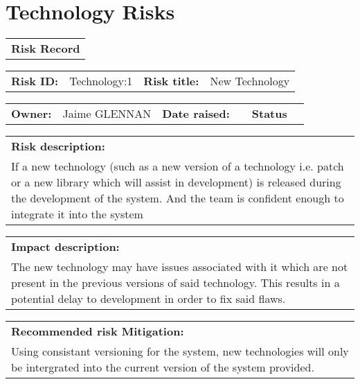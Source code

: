 \FloatBarrier

\section{Technology Risks}
\label{Technology_Risks}

\FloatBarrier

\begin{table}%
	\begin{tabularx}{\textwidth}{| X |}
		\hline
		\textbf{Risk Record} \\
	\end{tabularx}
	\begin{tabularx}{\textwidth}{| l | X | l | X |}
		\hline
		\textbf{Risk ID:} & Technology:1 & \textbf{Risk title:} & New Technology  \\
	\end{tabularx}
	\begin{tabularx}{\textwidth}{| l | X | l | X | l | X |}
		\hline
		\textbf{Owner:} & Jaime GLENNAN & \textbf{Date raised:} &  & \textbf{Status} & \\
	\end{tabularx}
	\begin{tabularx}{\textwidth}{| X |}
		\hline
		\textbf{Risk description:} \\ If a new technology (such as a new version of a technology i.e. patch or a new library which will assist in development) is released during the development of the system. And the team is confident enough to integrate it into the system   \\
	\end{tabularx}
	\begin{tabularx}{\textwidth}{| X |}
		\hline
		\textbf{Impact description:} \\ The new technology may have issues associated with it which are not present in the previous versions of said technology. This results in a potential delay to development in order to fix said flaws.\\
	\end{tabularx}
	\begin{tabularx}{\textwidth}{| X |}
		\hline
		\textbf{Recommended risk Mitigation:} \\ Using consistant versioning for the system, new technologies will only be intergrated into the current version of the system provided. \\
	\end{tabularx}
	\begin{tabularx}{\textwidth}{| X |}

\end{tabularx}
\end{table}
